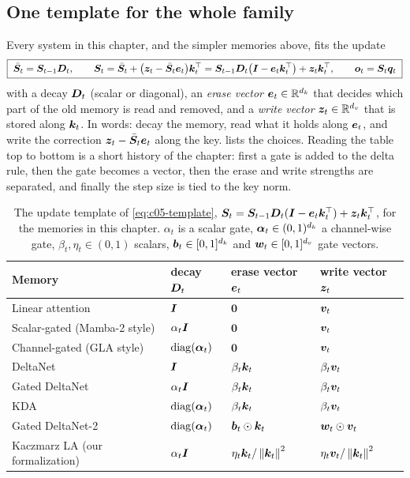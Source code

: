 \subsection{One template for the whole family}\label{sec:c05-bg-template}

Every system in this chapter, and the simpler memories above, fits the update
\begin{equation}\label{eq:c05-template}
  \boxed{\;\bar{\bm{S}}_t = \bm{S}_{t-1}\bm{D}_t, \qquad
  \bm{S}_t = \bar{\bm{S}}_t + \big(\bm{z}_t - \bar{\bm{S}}_t\bm{e}_t\big)\bm{k}_t^{\top}
        = \bm{S}_{t-1}\bm{D}_t\big(\bm{I} - \bm{e}_t\bm{k}_t^{\top}\big) + \bm{z}_t\bm{k}_t^{\top} ,\qquad
  \bm{o}_t = \bm{S}_t\bm{q}_t\;}
\end{equation}
with a decay $\bm{D}_t$ (scalar or diagonal), an \emph{erase vector} $\bm{e}_t \in \mathbb{R}^{d_k}$ that
decides which part of the old memory is read and removed, and a \emph{write vector}
$\bm{z}_t \in \mathbb{R}^{d_v}$ that is stored along $\bm{k}_t$. In words: decay the memory, read what it holds
along $\bm{e}_t$, and write the correction $\bm{z}_t - \bar{\bm{S}}_t\bm{e}_t$ along the key.
 lists the choices. Reading the table top to bottom is a short history of
the chapter: first a gate is added to the delta rule, then the gate becomes a vector, then the
erase and write strengths are separated, and finally the step size is tied to the key norm.

\begin{table}[t]
\centering\small
\caption{The update template of \cref{eq:c05-template},
$\bm{S}_t = \bm{S}_{t-1}\bm{D}_t(\bm{I} - \bm{e}_t\bm{k}_t^{\top}) + \bm{z}_t\bm{k}_t^{\top}$, for the memories in this chapter.
$\alpha_t$ is a scalar gate, $\bm{\alpha}_t \in (0,1)^{d_k}$ a channel-wise gate,
$\beta_t, \eta_t \in (0,1)$ scalars, $\bm{b}_t \in [0,1]^{d_k}$ and $\bm{w}_t \in [0,1]^{d_v}$ gate vectors.}
\label{tab:c05-template}
\begin{tabular}{@{}llll@{}}
\toprule
Memory & decay $\bm{D}_t$ & erase vector $\bm{e}_t$ & write vector $\bm{z}_t$ \\
\midrule
Linear attention & $\bm{I}$ & $\mathbf{0}$ & $\bm{v}_t$ \\
Scalar-gated (Mamba-2 style) & $\alpha_t\bm{I}$ & $\mathbf{0}$ & $\bm{v}_t$ \\
Channel-gated (GLA style) & $\operatorname{diag}(\bm{\alpha}_t)$ & $\mathbf{0}$ & $\bm{v}_t$ \\
DeltaNet & $\bm{I}$ & $\beta_t\bm{k}_t$ & $\beta_t\bm{v}_t$ \\
\midrule
Gated DeltaNet & $\alpha_t\bm{I}$ & $\beta_t\bm{k}_t$ & $\beta_t\bm{v}_t$ \\
KDA & $\operatorname{diag}(\bm{\alpha}_t)$ & $\beta_t\bm{k}_t$ & $\beta_t\bm{v}_t$ \\
Gated DeltaNet-2 & $\operatorname{diag}(\bm{\alpha}_t)$ & $\bm{b}_t\odot\bm{k}_t$ & $\bm{w}_t\odot\bm{v}_t$ \\
Kaczmarz LA (our formalization) & $\alpha_t\bm{I}$ & $\eta_t\bm{k}_t/\left\lVert \bm{k}_t\right\rVert^2$ & $\eta_t\bm{v}_t/\left\lVert \bm{k}_t\right\rVert^2$ \\
\bottomrule
\end{tabular}
\end{table}

